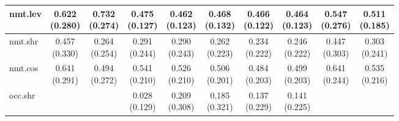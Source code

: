\documentclass[epsfig,a4paper,11pt,titlepage,twoside,openany]{book}
\begin{document}
\begin{table}[h]
\begin{tabular}{l|c|c|c|c|c|c|c|c|c|}
\multicolumn{1}{|l|}{nmt.lev}            & \makecell{0.622 \\ (0.280)}  & \makecell{0.732 \\ (0.274)} & \makecell{0.475 \\ (0.127)} & \makecell{0.462 \\ (0.123)} & \makecell{0.468 \\ (0.132)} & \makecell{0.466 \\ (0.122)} & \makecell{0.464 \\ (0.123)} & \makecell{0.547 \\ (0.276)}    & \makecell{0.511 \\ (0.185)}   \\ \hline
\multicolumn{1}{|l|}{nmt.shr}                 & \makecell{0.457 \\ (0.330)}  & \makecell{0.264 \\ (0.254)} & \makecell{0.291 \\ (0.244)} & \makecell{0.290 \\ (0.243)} & \makecell{0.262 \\ (0.223)} & \makecell{0.234 \\ (0.222)} & \makecell{0.246 \\ (0.222)} & \makecell{0.447 \\ (0.303)}    & \makecell{0.303 \\ (0.241)}   \\ \hline
\multicolumn{1}{|l|}{nmt.cos} & \makecell{0.641 \\ (0.291)}  & \makecell{0.494 \\ (0.272)} & \makecell{0.541 \\ (0.210)} & \makecell{0.526 \\ (0.210)} & \makecell{0.506 \\ (0.201)} & \makecell{0.484 \\ (0.203)} & \makecell{0.499 \\ (0.203)} & \makecell{0.641 \\ (0.244)}    & \makecell{0.535 \\ (0.216)}   \\ \hline
\multicolumn{1}{|l|}{occ.shr}                  &               &              & \makecell{0.028 \\ (0.129)} & \makecell{0.209 \\ (0.308)} & \makecell{0.185 \\ (0.321)} & \makecell{0.137 \\ (0.229)} & \makecell{0.141 \\ (0.225)} &                 &                \\ \hline

\end{tabular}
\end{table}
\end{document}
